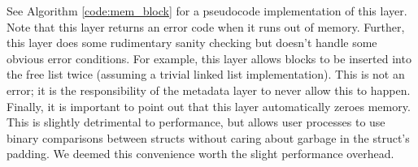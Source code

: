 \documentclass[12pt]{report}
\begin{document}
    See Algorithm \ref{code:mem_block} for a pseudocode implementation of this
    layer. Note that this layer returns an error code when it runs out of
    memory. Further, this layer does some rudimentary sanity checking but
    doesn't handle some obvious error conditions. For example, this layer allows
    blocks to be inserted into the free list twice (assuming a trivial linked
    list implementation). This is not an error; it is the responsibility of
    the metadata layer to never allow this to happen. Finally, it is important
    to point out that this layer automatically zeroes memory. This is slightly
    detrimental to performance, but allows user processes to use binary
    comparisons between structs without caring about garbage in the struct's
    padding. We deemed this convenience worth the slight performance overhead.
\end{document}

